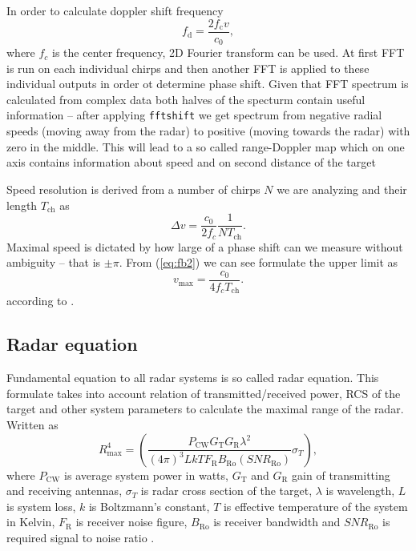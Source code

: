In order to calculate doppler shift frequency
\begin{equation}
  f_\mathrm{d} = \frac{2f_\mathrm{c}v}{c_0},
  \label{eq:doppler2}
\end{equation}
where $f_c$ is the center frequency, 2D Fourier transform can be used.
At first FFT is run on each individual chirps and then another FFT is applied to these individual outputs in order ot determine phase shift.
Given that FFT spectrum is calculated from complex data both halves of the specturm contain useful information -- after applying \verb|fftshift| we get spectrum from negative radial speeds (moving away from the radar) to positive (moving towards the radar) with zero in the middle.
This will lead to a so called range-Doppler map which on one axis contains information about speed and on second distance of the target \cite{suleymanov2016}

Speed resolution is derived from a number of chirps $N$ we are analyzing and their length $T_{\mathrm{ch}}$ as
\begin{equation}
  \Delta v = \frac{c_0}{2f_c} \frac{1}{NT_{\mathrm{ch}}}.
  \label{eq:doppler3}
\end{equation}
Maximal speed is dictated by how large of a phase shift can we measure without ambiguity -- that is $\pm \pi$.
From (\ref{eq:fb2}) we can see formulate the upper limit as
\[
  v_\mathrm{max} = \frac{c_0}{4f_c T_\mathrm{ch}}.
\]
according to \cite{fmcwSpeed}.

\subsection{Radar equation}

Fundamental equation to all radar systems is so called radar equation.
This formulate takes into account relation of transmitted/received power, RCS of the target and other system parameters to calculate the maximal range of the radar.
Written as
\begin{equation}
	R_\mathrm{max}^4 = \left(\frac{P_{\mathrm{CW}}G_\mathrm{T}G_\mathrm{R}\lambda^2}{(4\pi)^3 L k T F_\mathrm{R}B_\mathrm{Ro}(SNR_\mathrm{Ro})} \sigma_T\right),
	\label{eq:radar_eq}
\end{equation}
where $P_\mathrm{CW}$ is average system power in watts, $G_\mathrm{T}$ and $G_\mathrm{R}$ gain of transmitting and receiving antennas, $\sigma_T$ is radar cross section of the target, $\lambda$ is wavelength, $L$ is system loss, $k$ is Boltzmann's constant, $T$ is effective temperature of the system in Kelvin, $F_\mathrm{R}$ is receiver noise figure, $B_\mathrm{Ro}$ is receiver bandwidth and $SNR_\mathrm{Ro}$ is required signal to noise ratio \cite{jankiraman2018}.


